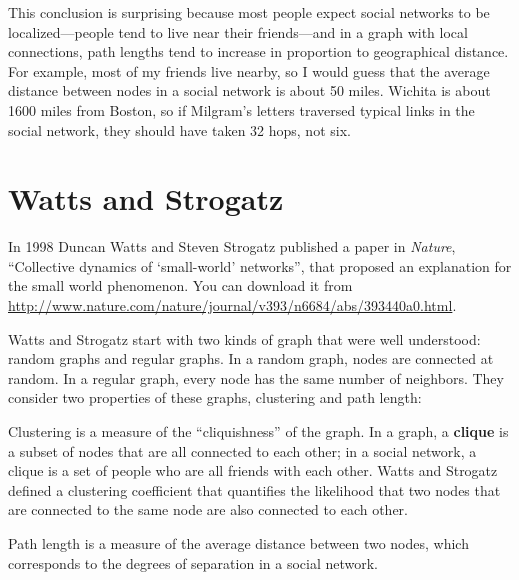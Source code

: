\documentclass[12pt]{book}
\theoremstyle{exercise}
\begin{document}
This conclusion is surprising because most people expect social
networks to be localized---people tend to live near their
friends---and in a graph with local connections, path lengths tend to
increase in proportion to geographical distance.  For example, most of
my friends live nearby, so I would guess that the average distance
between nodes in a social network is about 50 miles.  Wichita is about
1600 miles from Boston, so if Milgram's letters traversed typical
links in the social network, they should have taken 32 hops, not six.


\section{Watts and Strogatz}

In 1998 Duncan Watts and Steven Strogatz published a paper in {\em
  Nature}, ``Collective dynamics of `small-world' networks'', that
proposed an explanation for the small world phenomenon.  You can
download it from
\url{http://www.nature.com/nature/journal/v393/n6684/abs/393440a0.html}.
  

Watts and Strogatz start with two kinds of graph that were well
understood: random graphs and regular graphs.  In a random graph, nodes
are connected at random.  In a regular graph, every node has the
same number of neighbors.
They consider two
properties of these graphs, clustering and path length:

\begin{description}

\item Clustering is a measure of the ``cliquishness'' of the graph.
In a graph, a {\bf clique} is a subset of nodes that are
all connected to each other; in a social network, a clique is
a set of people who are all friends with each other.  Watts and Strogatz
defined a clustering coefficient that quantifies the likelihood
that two nodes that are connected to the same node are also
connected to each other.

\item Path length is a measure of the average distance between
two nodes, which corresponds to the degrees of separation in
a social network.

\end{description}
\end{document}

